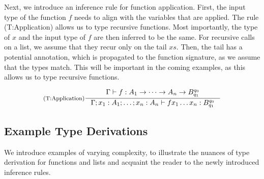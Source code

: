 Next, we introduce an inference rule for function application. First, the input type of the function \(f\) needs to align with the variables that are applied. The rule (T:Application) allows us to type recursive functions. Most importantly, the type of \(x\) and the input type of \(f\) are then inferred to be the same. For recursive calls on a list, we assume that they recur only on the tail \(xs\). Then, the tail has a potential annotation, which is propagated to the function signature, as we assume that the types match. This will be important in the coming examples, as this allows us to type recursive functions.

\[
   \inference[(T:Application)]
   {\typing{\Gamma}{f}{A_1 \to \dots \to A_n \to \ratype{B}{q_0}{q_1}}}
   {\typing{\Gamma;x_1:A_1;\dots;x_n:A_n}{f x_1 \dots x_n}{\ratype{B}{q_0}{q_1}}}
\]


\subsection{Example Type Derivations}\label{sec:example-type-derivations}

We introduce examples of varying complexity, to illustrate the nuances of type derivation for functions and lists and acquaint the reader to the newly introduced inference rules.

